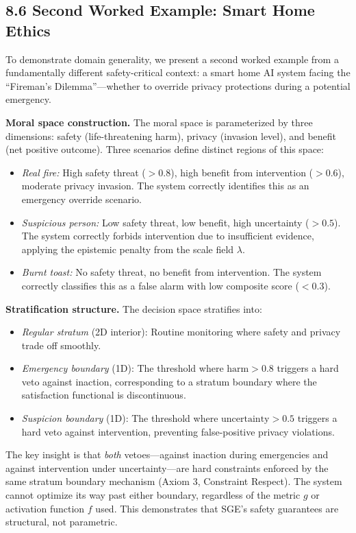 \documentclass[12pt]{article}
\theoremstyle{plain}
\theoremstyle{definition}
\theoremstyle{remark}
\begin{document}
\subsection{8.6 Second Worked Example: Smart Home Ethics}\label{smart-home-ethics}

To demonstrate domain generality, we present a second worked example from a fundamentally different safety-critical context: a smart home AI system facing the ``Fireman's Dilemma''---whether to override privacy protections during a potential emergency.

\textbf{Moral space construction.} The moral space is parameterized by three dimensions: safety (life-threatening harm), privacy (invasion level), and benefit (net positive outcome). Three scenarios define distinct regions of this space:

\begin{itemize}
\item \emph{Real fire:} High safety threat ($> 0.8$), high benefit from intervention ($> 0.6$), moderate privacy invasion. The system correctly identifies this as an emergency override scenario.
\item \emph{Suspicious person:} Low safety threat, low benefit, high uncertainty ($> 0.5$). The system correctly forbids intervention due to insufficient evidence, applying the epistemic penalty from the scale field $\lambda$.
\item \emph{Burnt toast:} No safety threat, no benefit from intervention. The system correctly classifies this as a false alarm with low composite score ($< 0.3$).
\end{itemize}

\textbf{Stratification structure.} The decision space stratifies into:
\begin{itemize}
\item \emph{Regular stratum} (2D interior): Routine monitoring where safety and privacy trade off smoothly.
\item \emph{Emergency boundary} (1D): The threshold where $\text{harm} > 0.8$ triggers a hard veto against inaction, corresponding to a stratum boundary where the satisfaction functional is discontinuous.
\item \emph{Suspicion boundary} (1D): The threshold where $\text{uncertainty} > 0.5$ triggers a hard veto against intervention, preventing false-positive privacy violations.
\end{itemize}

The key insight is that \emph{both} vetoes---against inaction during emergencies and against intervention under uncertainty---are hard constraints enforced by the same stratum boundary mechanism (Axiom 3, Constraint Respect). The system cannot optimize its way past either boundary, regardless of the metric $g$ or activation function $f$ used. This demonstrates that SGE's safety guarantees are structural, not parametric.
\end{document}
